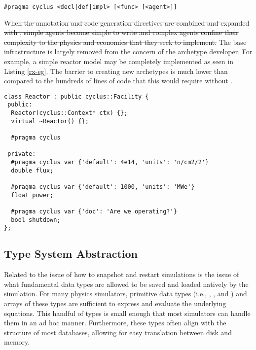 \begin{lstlisting}[caption={Targeted Code Generation Directive Signatures}, 
                   label=targ-cg]
#pragma cyclus <decl|def|impl> [<func> [<agent>]]
\end{lstlisting}

\sout{When the annotation and code generation directives are combined and expanded with 
\cycpp, simple agents become simple to write and complex agents confine their 
complexity to the physics and economics that they seek to implement.}  The base \cyclus
infrastructure is largely removed from the concern of the archetype developer.
For example, a simple reactor model may be completely implemented as seen in 
Listing \ref{rx-eg}. The barrier to creating new archetypes is much lower than 
compared to the hundreds of lines of code that this would require without \cycpp.

\begin{lstlisting}[caption={Simple Reactor Archetype}, label=rx-eg]
class Reactor : public cyclus::Facility {
 public:
  Reactor(cyclus::Context* ctx) {};
  virtual ~Reactor() {};

  #pragma cyclus

 private:
  #pragma cyclus var {'default': 4e14, 'units': 'n/cm2/2'}
  double flux;

  #pragma cyclus var {'default': 1000, 'units': 'MWe'}
  float power;

  #pragma cyclus var {'doc': 'Are we operating?'}
  bool shutdown;
};
\end{lstlisting}

\subsection{Type System Abstraction}

Related to the issue of how to snapshot and restart simulations is the issue of 
what fundamental data types are allowed to be saved and loaded natively by the 
simulation. For many physics simulators, primitive data types (i.e., , 
, and ) and arrays of these types are sufficient to 
express and evaluate the underlying equations. This handful of types is small enough 
that most simulators can handle them in an ad hoc manner. Furthermore, these types
often align with the structure of most databases, allowing for easy translation
between disk and memory.

